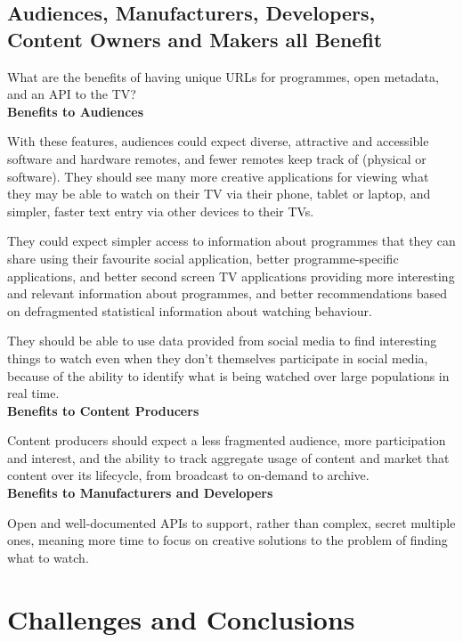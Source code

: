 \documentclass[]{article}%
\begin{document}
\subsection{Audiences, Manufacturers, Developers, Content Owners and Makers all Benefit}

What are the benefits of having unique URLs for programmes, open metadata, and an API to the TV?
\\

{\bf{Benefits to Audiences}}

With these features, audiences could expect diverse, attractive and accessible software and hardware remotes, and fewer remotes keep track of (physical or software). They should see many more creative applications for viewing what they may be able to watch on their TV via their phone, tablet or laptop, and simpler, faster text entry via other devices to their TVs. 

They could expect simpler access to information about programmes that they can share using their favourite social application, better programme-specific applications, and better second screen TV applications providing more interesting and relevant information about programmes, and better recommendations based on defragmented statistical information about watching behaviour.

They should be able to use data provided from social media to find interesting things to watch even when they don't themselves participate in social media, because of the ability to identify what is being watched over large populations in real time.
\\

{\bf{Benefits to Content Producers}}

Content producers should expect a less fragmented audience, more participation and interest, and the ability to track aggregate usage of content and market that content over its lifecycle, from broadcast to on-demand to archive.
\\

{\bf{Benefits to Manufacturers and Developers}}

Open and well-documented APIs to support, rather than complex, secret multiple ones, meaning more time to focus on creative solutions to the problem of finding what to watch.

\section{Challenges and Conclusions}
\end{document}
